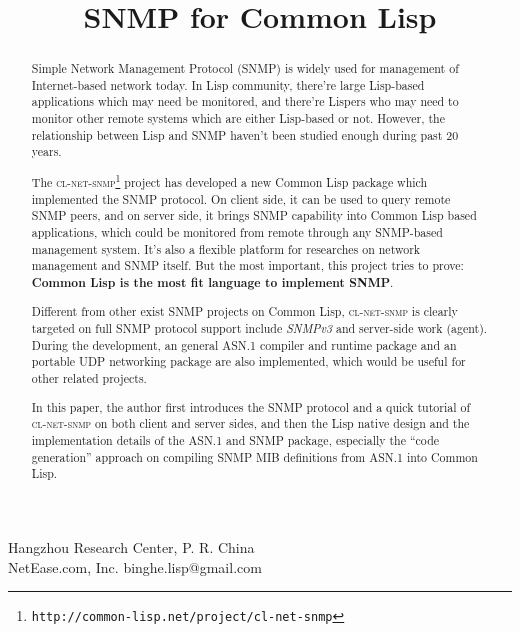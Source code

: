 \documentclass[reprint,natbib,9pt]{sigplanconf}
\begin{document}
\copyrightdata{}

\toappear{}


\title{SNMP for Common Lisp}

           {Hangzhou Research Center, P. R. China\\NetEase.com, Inc.}
           {binghe.lisp@gmail.com}

\maketitle

\begin{abstract}
  Simple Network Management Protocol (SNMP) is widely used for management of
  Internet-based network today. In Lisp community, there're large Lisp-based
  applications which may need be monitored, and there're Lispers who may need
  to monitor other remote systems which are either Lisp-based or not.
  However, the relationship between Lisp and SNMP haven't been studied enough
  during past 20 years.
  
  The
  \textsc{cl-net-snmp}\footnote{\texttt{http://common-lisp.net/project/cl-net-snmp}}
  project has developed a new Common Lisp package which implemented the
  SNMP protocol. On client side, it can be used to query remote SNMP peers,
  and on server side, it brings SNMP capability into Common Lisp based applications,
  which could be monitored from remote through any SNMP-based management system.
  It's also a flexible platform for researches on network management and SNMP itself.
  But the most important, this project tries to prove: \textbf{Common Lisp is the most
  fit language to implement SNMP}.

  Different from other exist SNMP projects on Common Lisp,
  \textsc{cl-net-snmp} is clearly targeted on full SNMP
  protocol support include \textsl{SNMPv3} and server-side work (agent). During
  the development, an general ASN.1 compiler and runtime package and
  an portable UDP networking
  package are also implemented, which would be useful for other related
  projects.

  In this paper, the author first introduces the SNMP protocol and
  a quick tutorial of \textsc{cl-net-snmp}
  on both client and server sides, and then the Lisp native design
  and the implementation details of the ASN.1 and SNMP package,
  especially the ``code generation'' approach on compiling SNMP MIB
  definitions from ASN.1 into Common Lisp.
\end{abstract}
\end{document}
